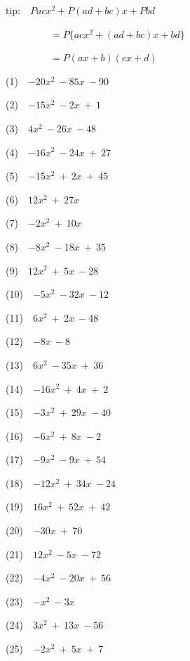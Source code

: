 \documentclass[a4j,twocolumn,10pt,fleqn]{jarticle}
\begin{document}
tip:~~$Pacx^2 + P(ad + bc)x + Pbd$

~~~~~~~~~$= P\{acx^2 + (ad + bc)x +bd\}$

~~~~~~~~~$= P(ax + b)(cx + d)$

(1)~~$-20x^2~-85x~-90$

(2)~~$-15x^2~-2x~+~1$

(3)~~$4x^2~-26x~-48$

(4)~~$-16x^2~-24x~+~27$

(5)~~$-15x^2~+~2x~+~45$

(6)~~$12x^2~+~27x$

(7)~~$-2x^2~+~10x$

(8)~~$-8x^2~-18x~+~35$

(9)~~$12x^2~+~5x~-28$

(10)~~$-5x^2~-32x~-12$

(11)~~$6x^2~+~2x~-48$

(12)~~$-8x~-8$

(13)~~$6x^2~-35x~+~36$

(14)~~$-16x^2~+~4x~+~2$

(15)~~$-3x^2~+~29x~-40$

(16)~~$-6x^2~+~8x~-2$

(17)~~$-9x^2~-9x~+~54$

(18)~~$-12x^2~+~34x~-24$

(19)~~$16x^2~+~52x~+~42$

(20)~~$-30x~+~70$

(21)~~$12x^2~-5x~-72$

(22)~~$-4x^2~-20x~+~56$

(23)~~$-x^2~-3x$

(24)~~$3x^2~+~13x~-56$

(25)~~$-2x^2~+~5x~+~7$
\end{document}
